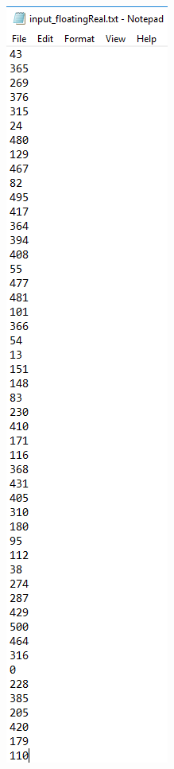 \documentclass[12pt, titlepage]{article}
\begin{document}
\begin{figure}[h!]
\centering
\begin{minipage}[b]{0.32\textwidth}
 \includegraphics[width=\textwidth]{Input_real}

\end{minipage}
\end{figure}
\end{document}
